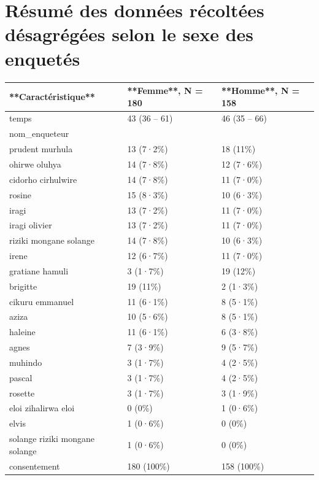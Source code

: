 \documentclass[
]{book}
\begin{document}
\hypertarget{ruxe9sumuxe9-des-donnuxe9es-ruxe9coltuxe9es-duxe9sagruxe9guxe9es-selon-le-sexe-des-enquetuxe9s}{%
\section{Résumé des données récoltées désagrégées selon le sexe des enquetés}\label{ruxe9sumuxe9-des-donnuxe9es-ruxe9coltuxe9es-duxe9sagruxe9guxe9es-selon-le-sexe-des-enquetuxe9s}}

\begin{tabular}{l|l|l}
\hline
**Caractéristique** & **Femme**, N = 180 & **Homme**, N = 158\\
\hline
temps & 43 (36 – 61) & 46 (35 – 66)\\
\hline
nom\_enqueteur &  & \\
\hline
prudent murhula & 13 (7·2\%) & 18 (11\%)\\
\hline
ohirwe oluhya & 14 (7·8\%) & 12 (7·6\%)\\
\hline
cidorho cirhulwire & 14 (7·8\%) & 11 (7·0\%)\\
\hline
rosine & 15 (8·3\%) & 10 (6·3\%)\\
\hline
iragi & 13 (7·2\%) & 11 (7·0\%)\\
\hline
iragi olivier & 13 (7·2\%) & 11 (7·0\%)\\
\hline
riziki mongane solange & 14 (7·8\%) & 10 (6·3\%)\\
\hline
irene & 12 (6·7\%) & 11 (7·0\%)\\
\hline
gratiane hamuli & 3 (1·7\%) & 19 (12\%)\\
\hline
brigitte & 19 (11\%) & 2 (1·3\%)\\
\hline
cikuru emmanuel & 11 (6·1\%) & 8 (5·1\%)\\
\hline
aziza & 10 (5·6\%) & 8 (5·1\%)\\
\hline
haleine & 11 (6·1\%) & 6 (3·8\%)\\
\hline
agnes & 7 (3·9\%) & 9 (5·7\%)\\
\hline
muhindo & 3 (1·7\%) & 4 (2·5\%)\\
\hline
pascal & 3 (1·7\%) & 4 (2·5\%)\\
\hline
rosette & 3 (1·7\%) & 3 (1·9\%)\\
\hline
eloi zihalirwa eloi & 0 (0\%) & 1 (0·6\%)\\
\hline
elvis & 1 (0·6\%) & 0 (0\%)\\
\hline
solange riziki mongane solange & 1 (0·6\%) & 0 (0\%)\\
\hline
consentement & 180 (100\%) & 158 (100\%)\\

\end{tabular}
\end{document}
